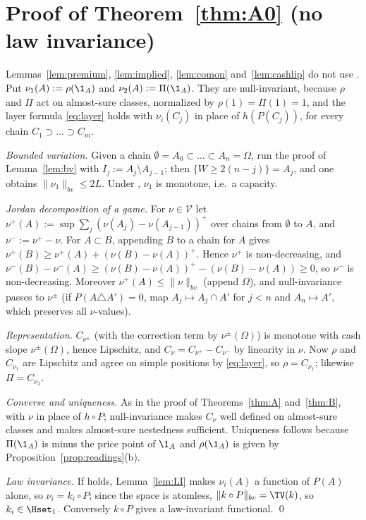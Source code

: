 \section{Proof of Theorem~\ref{thm:A0} (no law invariance)}\label{app:A0}


Lemmas~\ref{lem:premium}, \ref{lem:implied}, \ref{lem:comon} and~\ref{lem:cashlip} do not use \axLI. Put
$\nu_1(A):=\rho(\1_A)$ and $\nu_2(A):=\Pi(\1_A)$. They are null-invariant, because $\rho$ and $\Pi$ act on
almost-sure classes, normalized by $\rho(1)=\Pi(1)=1$, and the layer formula \eqref{eq:layer} holds with
$\nu_i(C_j)$ in place of $h(P(C_j))$, for every chain $C_1\supset\dots\supset C_m$.

\emph{Bounded variation.} Given a chain $\emptyset=A_0\subset\dots\subset A_n=\Omega$, run the proof of
Lemma~\ref{lem:bv} with $I_j:=A_j\setminus A_{j-1}$; then $\{W\ge2(n-j)\}=A_j$, and one obtains
$\|\nu_1\|_{bv}\le2L$. Under \axRM, $\nu_1$ is monotone, i.e.\ a capacity.

\emph{Jordan decomposition of a game.} For $\nu\in\mathcal V$ let $\nu^+(A):=\sup\sum_j(\nu(A_j)-\nu(A_{j-1}))^+$
over chains from $\emptyset$ to $A$, and $\nu^-:=\nu^+-\nu$.
For $A\subset B$, appending $B$ to a chain for $A$ gives $\nu^+(B)\ge\nu^+(A)+(\nu(B)-\nu(A))^+$. Hence $\nu^+$ is
non-decreasing, and $\nu^-(B)-\nu^-(A)\ge(\nu(B)-\nu(A))^+-(\nu(B)-\nu(A))\ge0$, so $\nu^-$ is non-decreasing.
Moreover $\nu^+(A)\le\|\nu\|_{bv}$ (append $\Omega$), and null-invariance passes to $\nu^\pm$ (if $P(A\triangle A')=0$,
map $A_j\mapsto A_j\cap A'$ for $j<n$ and $A_n\mapsto A'$, which preserves all $\nu$-values).

\emph{Representation.} $C_{\nu^\pm}$ (with the correction term by $\nu^\pm(\Omega)$) is monotone with cash slope
$\nu^\pm(\Omega)$, hence Lipschitz, and $C_\nu=C_{\nu^+}-C_{\nu^-}$ by linearity in $\nu$. Now $\rho$ and
$C_{\nu_1}$ are Lipschitz and agree on simple positions by \eqref{eq:layer}, so $\rho=C_{\nu_1}$; likewise
$\Pi=C_{\nu_2}$.

\emph{Converse and uniqueness.} As in the proof of Theorems~\ref{thm:A} and~\ref{thm:B}, with $\nu$ in place of
$h\circ P$; null-invariance makes $C_\nu$ well defined on almost-sure classes and makes almost-sure nestedness
sufficient. Uniqueness follows because $\Pi(\1_A)$ is minus the price point of $\1_A$ and $\rho(\1_A)$ is given by
Proposition~\ref{prop:readings}(b).

\emph{Law invariance.} If \axLI{} holds, Lemma~\ref{lem:LI} makes $\nu_i(A)$ a function of $P(A)$ alone, so
$\nu_i=k_i\circ P$; since the space is atomless, $\|k\circ P\|_{bv}=\TV(k)$, so $k_i\in\Hset_1$. Conversely
$k\circ P$ gives a law-invariant functional. \qed

